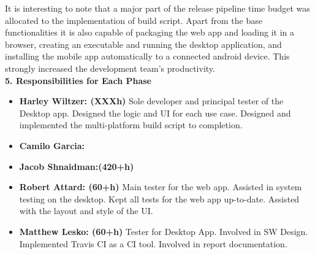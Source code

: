 \documentclass[12pt]{article}
\begin{document}
It is interesting to note that a major part of the release pipeline time budget was allocated to the
implementation of build script. Apart from the base functionalities it is also capable of packaging
the web app and loading it in a browser, creating an executable and running the desktop application,
and installing the mobile app automatically to a connected android device. This strongly increased
the development team's productivity.\\

\textbf{5. Responsibilities for Each Phase}
\begin{itemize}
    \item \textbf{Harley Wiltzer: (XXXh)} Sole developer and principal tester of the Desktop app. Designed the logic and UI for each use case. Designed and implemented the multi-platform build script to completion.
    \item \textbf{Camilo Garcia: }
    \item \textbf{Jacob Shnaidman:(420+h) }
    \item \textbf{Robert Attard: (60+h)}
    Main tester for the web app. Assisted in system testing on the desktop. Kept all tests for the web app up-to-date. Assisted with the layout and style of the UI.
    \item \textbf{Matthew Lesko: (60+h)} Tester for Desktop App. Involved in SW Design. Implemented Travis CI as a CI tool. Involved in report documentation.
\end{itemize}
\end{document}

